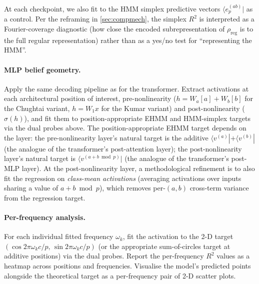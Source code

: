 \documentclass[11pt,a4paper]{article}
\begin{document}
At each checkpoint, we also fit to the HMM simplex predictive vectors $\langle e_p^{(ab)}|$ as a control. Per the reframing in \cref{sec:compmech}, the simplex $R^2$ is interpreted as a Fourier-coverage diagnostic (how close the encoded subrepresentation of $\rho_{\mathrm{reg}}$ is to the full regular representation) rather than as a yes/no test for ``representing the HMM''.

\paragraph{MLP belief geometry.} Apply the same decoding pipeline as for the transformer. Extract activations at each architectural position of interest, pre-nonlinearity ($h = W_a[a] + W_b[b]$ for the Chughtai variant, $h = W_1 x$ for the Kumar variant) and post-nonlinearity ($\sigma(h)$), and fit them to position-appropriate EHMM and HMM-simplex targets via the dual probes above. The position-appropriate EHMM target depends on the layer: the pre-nonlinearity layer's natural target is the additive $\langle v^{(a)}| + \langle v^{(b)}|$ (the analogue of the transformer's post-attention layer); the post-nonlinearity layer's natural target is $\langle v^{(a+b \bmod p)}|$ (the analogue of the transformer's post-MLP layer). At the post-nonlinearity layer, a methodological refinement is to also fit the regression on \emph{class-mean activations} (averaging activations over inputs sharing a value of $a+b \bmod p$), which removes per-$(a,b)$ cross-term variance from the regression target.

\paragraph{Per-frequency analysis.} For each individual fitted frequency $\omega_k$, fit the activation to the 2-D target $(\cos 2\pi\omega_k c/p,\, \sin 2\pi\omega_k c/p)$ (or the appropriate sum-of-circles target at additive positions) via the dual probes. Report the per-frequency $R^2$ values as a heatmap across positions and frequencies. Visualise the model's predicted points alongside the theoretical target as a per-frequency pair of 2-D scatter plots.
\end{document}
